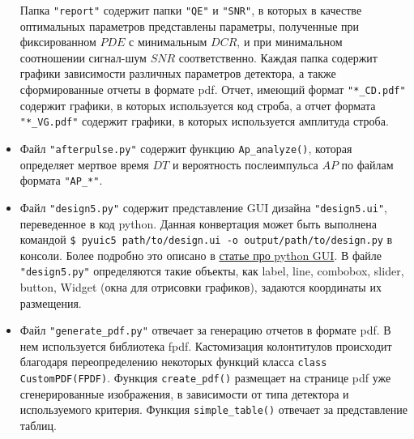 \documentclass[12pt]{article}
\begin{document}
\begin{itemize}
   Папка \verb|"report"| содержит папки \verb|"QE"| и \verb|"SNR"|, в которых в качестве оптимальных параметров представлены параметры, полученные при фиксированном $PDE$ с минимальным $DCR$, и при минимальном соотношении сигнал-шум $SNR$ соответственно. Каждая папка содержит графики зависимости различных параметров детектора, а также сформированные отчеты в формате pdf. Отчет, имеющий формат  \verb|"*_CD.pdf"| содержит графики, в которых используется код строба, а отчет формата  \verb|"*_VG.pdf"| содержит графики, в которых используется амплитуда строба. 


   \item Файл \verb|"afterpulse.py"| содержит функцию \verb|Ap_analyze()|, которая определяет мертвое время $DT$ и вероятность послеимпульса  $AP$ по файлам формата \verb|"AP_*"|. 
   
   \item  Файл \verb|"design5.py"| содержит представление GUI дизайна \verb|"design5.ui"|, переведенное в код python. Данная конвертация может быть выполнена командой \verb|$ pyuic5 path/to/design.ui -o output/path/to/design.py| в консоли. Более подробно  это описано в \href{https://tproger.ru/translations/python-gui-pyqt/}{статье про python GUI}. В файле \verb|"design5.py"| определяются такие объекты, как label, line, combobox, slider, button, Widget (окна для отрисовки графиков), задаются координаты их размещения.
   
   \item Файл \verb|"generate_pdf.py"| отвечает за генерацию отчетов в формате pdf. В нем  используется  библиотека fpdf. Кастомизация колонтитулов происходит благодаря переопределению некоторых функций класса \verb|class CustomPDF(FPDF)|. Функция \verb|create_pdf()| размещает на странице pdf уже сгенерированные изображения, в зависимости от типа детектора и используемого критерия. Функция \verb|simple_table()| отвечает за представление таблиц.  
    

\end{itemize}
\end{document}
